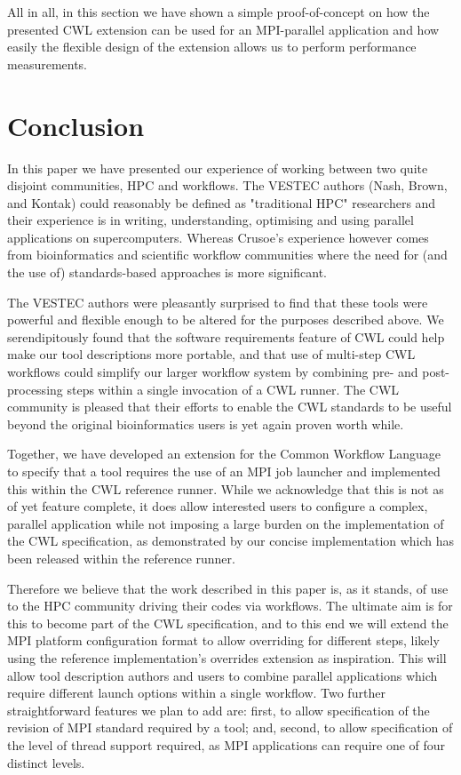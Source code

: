 \documentclass[conference]{IEEEtran}
\begin{document}
All in all, in this section we have shown a simple proof-of-concept on how the presented CWL extension can be used for an MPI-parallel application and how easily the flexible design of the extension allows us to perform performance measurements.


\section{Conclusion}
\label{sec:conclusions}

In this paper we have presented our experience of working between two quite disjoint communities, HPC and workflows. The VESTEC authors (Nash, Brown, and Kontak) could reasonably be defined as "traditional HPC" researchers and their experience is in writing, understanding, optimising and using parallel applications on supercomputers. Whereas Crusoe's experience however comes from bioinformatics and scientific workflow communities where the need for (and the use of) standards-based approaches is more significant.

The VESTEC authors were pleasantly surprised to find that these tools were powerful and flexible enough to be altered for the purposes described above. We serendipitously found that the software requirements feature of CWL could help make our tool descriptions more portable, and that use of multi-step CWL workflows could simplify our larger workflow system by combining pre- and post-processing steps within a single invocation of a CWL runner. The CWL community is pleased that their efforts to enable the CWL standards to be useful beyond the original bioinformatics users is yet again proven worth while.

Together, we have developed an extension for the Common Workflow Language to specify that a tool requires the use of an MPI job launcher and implemented this within the CWL reference runner. While we acknowledge that this is not as of yet feature complete, it does allow interested users to configure a complex, parallel application while not imposing a large burden on the implementation of the CWL specification, as demonstrated by our concise implementation which has been released within the reference runner.

Therefore we believe that the work described in this paper is, as it stands, of use to the HPC community driving their codes via workflows. The ultimate aim is for this to become part of the CWL specification, and to this end we will extend the MPI platform configuration format to allow overriding for different steps, likely using the reference implementation's overrides extension as inspiration. This will allow tool description authors and users to combine parallel applications which require different launch options within a single workflow. Two further straightforward features we plan to add are: first, to allow specification of the revision of MPI standard required by a tool; and, second, to allow specification of the level of thread support required, as MPI applications can require one of four distinct levels.
\end{document}
